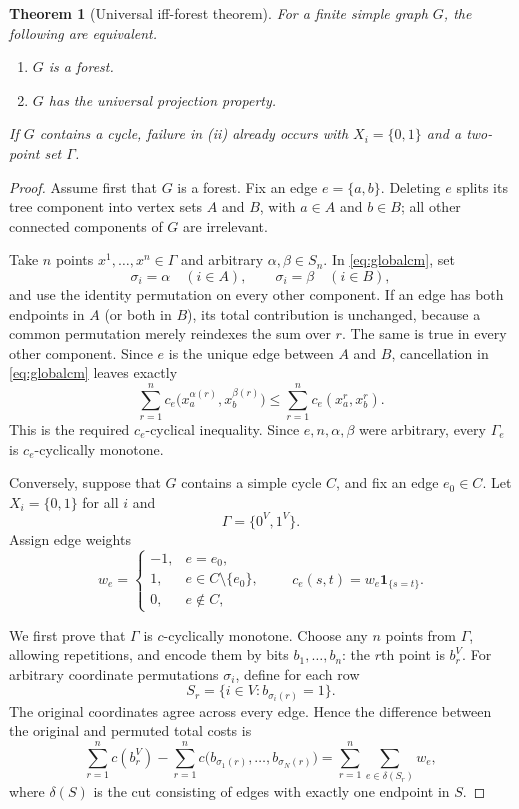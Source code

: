 \documentclass[11pt]{article}
\newtheorem{theorem}{Theorem}
\newcommand{\1}{\mathbf 1}
\begin{document}
\begin{theorem}[Universal iff-forest theorem]\label{thm:main}
For a finite simple graph $G$, the following are equivalent.
\begin{enumerate}[label=\textup{(\roman*)}]
\item $G$ is a forest.
\item $G$ has the universal projection property.
\end{enumerate}
If $G$ contains a cycle, failure in \textup{(ii)} already occurs with
$X_i=\{0,1\}$ and a two-point set $\Gamma$.
\end{theorem}

\begin{proof}
Assume first that $G$ is a forest.  Fix an edge $e=\{a,b\}$.
Deleting $e$ splits its tree component into vertex sets $A$ and $B$, with
$a\in A$ and $b\in B$; all other connected components of $G$ are irrelevant.

Take $n$ points $x^1,\ldots,x^n\in\Gamma$ and arbitrary
$\alpha,\beta\in S_n$.  In \eqref{eq:globalcm}, set
\[
 \sigma_i=\alpha\quad(i\in A),\qquad
 \sigma_i=\beta\quad(i\in B),
\]
and use the identity permutation on every other component.  If an edge has
both endpoints in $A$ (or both in $B$), its total contribution is unchanged,
because a common permutation merely reindexes the sum over $r$.  The same is
true in every other component.  Since $e$ is the unique edge between $A$ and
$B$, cancellation in \eqref{eq:globalcm} leaves exactly
\[
 \sum_{r=1}^n c_e\bigl(x_a^{\alpha(r)},x_b^{\beta(r)}\bigr)
 \le
 \sum_{r=1}^n c_e(x_a^r,x_b^r).
\]
This is the required $c_e$-cyclical inequality.  Since $e,n,\alpha,\beta$
were arbitrary, every $\Gamma_e$ is $c_e$-cyclically monotone.

Conversely, suppose that $G$ contains a simple cycle $C$, and fix an edge
$e_0\in C$.  Let $X_i=\{0,1\}$ for all $i$ and
\[
 \Gamma=\{0^V,1^V\}.
\]
Assign edge weights
\[
 w_e=
 \begin{cases}
 -1,&e=e_0,\\
 1,&e\in C\setminus\{e_0\},\\
 0,&e\notin C,
 \end{cases}
 \qquad
 c_e(s,t)=w_e\1_{\{s=t\}}.
\]

We first prove that $\Gamma$ is $c$-cyclically monotone.  Choose any
$n$ points from $\Gamma$, allowing repetitions, and encode them by bits
$b_1,\ldots,b_n$: the $r$th point is $b_r^V$.  For arbitrary coordinate
permutations $\sigma_i$, define for each row
\[
 S_r=\{i\in V:b_{\sigma_i(r)}=1\}.
\]
The original coordinates agree across every edge.  Hence the difference
between the original and permuted total costs is
\begin{equation}\label{eq:cutsum}
 \sum_{r=1}^n c(b_r^V)
 -\sum_{r=1}^n c\bigl(b_{\sigma_1(r)},\ldots,b_{\sigma_N(r)}\bigr)
 =\sum_{r=1}^n\sum_{e\in\delta(S_r)}w_e,
\end{equation}
where $\delta(S)$ is the cut consisting of edges with exactly one endpoint
in $S$.


\end{proof}
\end{document}
